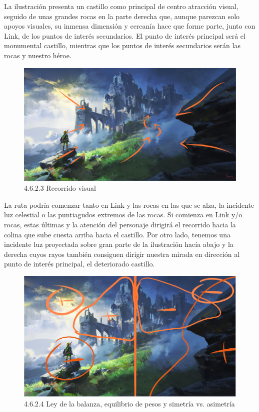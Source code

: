 \documentclass[12pt]{article}
\begin{document}
    La ilustración presenta un castillo como principal de centro atracción visual, seguido de unas grandes rocas en la parte derecha que, aunque parezcan solo apoyos visuales, su inmensa dimensión y cercanía hace que forme parte, junto con Link, de los puntos de interés secundarios. El punto de interés principal será el monumental castillo, mientras que los puntos de interés secundarios serán las rocas y nuestro héroe.

    \begin{figure}[H]
      \centering
      \includegraphics[scale=0.4]{images/Nerea/Nerea Zelda concept 623.PNG}
      \caption{\small 4.6.2.3 Recorrido visual}
    \end{figure}

    La ruta podría comenzar tanto en Link y las rocas en las que se alza, la incidente luz celestial o las puntiagudos extremos de las rocas. Si comienza en Link y/o rocas, estas últimas y la atención del personaje dirigirá el recorrido hacia la colina que sube cuesta arriba hacia el castillo. Por otro lado, tenemos una incidente luz proyectada sobre gran parte de la ilustración hacía abajo y la derecha cuyos rayos también consiguen dirigir nuestra mirada en dirección al punto de interés principal, el deteriorado castillo.

    \begin{figure}[H]
      \centering
      \includegraphics[scale=0.4]{images/Nerea/Nerea Zelda concept 624.PNG}
      \caption{\small 4.6.2.4 Ley de la balanza, equilibrio de pesos y simetría vs. asimetría}
    \end{figure}
\end{document}
